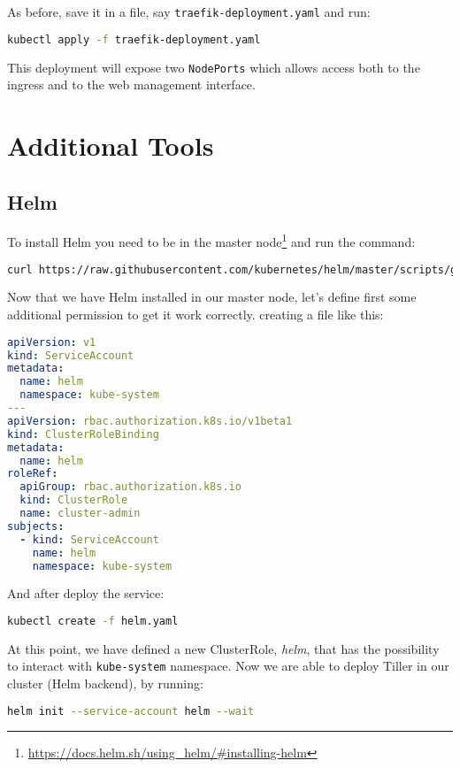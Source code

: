 As before, save it in a file, say \texttt{traefik-deployment.yaml} and run:
\begin{lstlisting}[language=bash]
kubectl apply -f traefik-deployment.yaml
\end{lstlisting}

This deployment will expose two \texttt{NodePorts} which allows access both to 
the ingress and to the web management interface.

\section{Additional Tools}
\label{additional-tools}

\subsection{Helm}
\label{helm}

To install Helm you need to be in the master node\footnote{
\url{https://docs.helm.sh/using_helm/\#installing-helm}} and run the
command:
\begin{lstlisting}[language=bash]
curl https://raw.githubusercontent.com/kubernetes/helm/master/scripts/get | bash
\end{lstlisting}

Now that we have Helm installed in our master node, let's define first
some additional permission to get it work correctly. creating a file like this:

\begin{lstlisting}[language=yaml]
apiVersion: v1
kind: ServiceAccount
metadata:
  name: helm
  namespace: kube-system
---
apiVersion: rbac.authorization.k8s.io/v1beta1
kind: ClusterRoleBinding
metadata:
  name: helm
roleRef:
  apiGroup: rbac.authorization.k8s.io
  kind: ClusterRole
  name: cluster-admin
subjects:
  - kind: ServiceAccount
    name: helm
    namespace: kube-system
\end{lstlisting}

And after deploy the service:
\begin{lstlisting}[language=bash]
kubectl create -f helm.yaml
\end{lstlisting}

At this point, we have defined a new ClusterRole, \emph{helm}, that has
the possibility to interact with \texttt{kube-system} namespace. Now
we are able to deploy Tiller in our cluster (Helm backend), by running:
\begin{lstlisting}[language=bash]
 helm init --service-account helm --wait
 \end{lstlisting}
